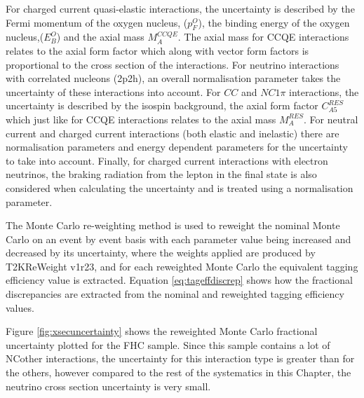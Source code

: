 For charged current quasi-elastic interactions, the uncertainty is described by the Fermi momentum of the oxygen nucleus, ($p_{F}^{O}$), the binding energy of the oxygen nucleus,($E_{B}^{O}$) and the axial mass $M_{A}^{C C Q E}$. The axial mass for CCQE interactions relates to the axial form factor which along with vector form factors is proportional to the cross section of the interactions. For neutrino interactions with correlated nucleons (2p2h), an overall normalisation parameter takes the uncertainty of these interactions into account. For $CC$ and $NC1\pi$ interactions, the uncertainty is described by the isospin background, the axial form factor $C_{A 5}^{R E S}$ which just like for CCQE interactions relates to the axial mass $M_{A}^{R E S}$. For neutral current and charged current interactions (both elastic and inelastic) there are normalisation parameters and energy dependent parameters for the uncertainty to take into account. Finally, for charged current interactions with electron neutrinos, the braking radiation from the lepton in the final state is also considered when calculating the uncertainty and is treated using a normalisation parameter.
\newline

The Monte Carlo re-weighting method is used to reweight the nominal Monte Carlo on an event by event basis with each parameter value being increased and decreased by its uncertainty, where the weights applied are produced by T2KReWeight v1r23, and for each reweighted Monte Carlo the equivalent tagging efficiency value is extracted. Equation \ref{eq:tageffdiscrep} shows how the fractional discrepancies are extracted from the nominal and reweighted tagging efficiency values.

Figure \ref{fig:xsecuncertainty} shows the reweighted Monte Carlo fractional uncertainty plotted for the FHC sample. Since this sample contains a lot of NCother interactions, the uncertainty for this interaction type is greater than for the others, however compared to the rest of the systematics in this Chapter, the neutrino cross section uncertainty is very small.

